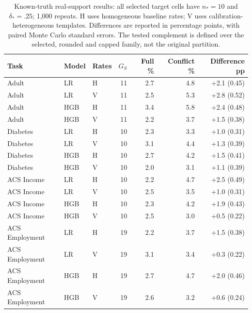 \begin{table}[t]
\centering\small
\caption{Known-truth real-support results: all selected target cells have $n_*=10$ and $\delta_*=.25$; 1,000 repeats. H uses homogeneous baseline rates; V uses calibration-heterogeneous templates. Differences are reported in percentage points, with paired Monte Carlo standard errors. The tested complement is defined over the selected, rounded and capped family, not the original partition.}\label{tab:semi}
\begin{tabular}{lllrrrr}
\toprule
Task & Model & Rates & $G_S$ & Full \% & Conflict \% & Difference pp \\
\midrule
Adult & LR & H & 11 & 2.7 & 4.8 & +2.1 (0.45) \\
Adult & LR & V & 11 & 2.5 & 5.3 & +2.8 (0.52) \\
Adult & HGB & H & 11 & 3.4 & 5.8 & +2.4 (0.48) \\
Adult & HGB & V & 11 & 2.2 & 3.7 & +1.5 (0.38) \\
Diabetes & LR & H & 10 & 2.3 & 3.3 & +1.0 (0.31) \\
Diabetes & LR & V & 10 & 3.1 & 4.4 & +1.3 (0.39) \\
Diabetes & HGB & H & 10 & 2.7 & 4.2 & +1.5 (0.41) \\
Diabetes & HGB & V & 10 & 2.0 & 3.1 & +1.1 (0.39) \\
ACS Income & LR & H & 10 & 2.2 & 4.7 & +2.5 (0.49) \\
ACS Income & LR & V & 10 & 2.5 & 3.5 & +1.0 (0.31) \\
ACS Income & HGB & H & 10 & 2.3 & 4.2 & +1.9 (0.43) \\
ACS Income & HGB & V & 10 & 2.5 & 3.0 & +0.5 (0.22) \\
ACS Employment & LR & H & 19 & 2.2 & 3.7 & +1.5 (0.38) \\
ACS Employment & LR & V & 19 & 3.1 & 3.4 & +0.3 (0.22) \\
ACS Employment & HGB & H & 19 & 2.7 & 4.7 & +2.0 (0.46) \\
ACS Employment & HGB & V & 19 & 2.6 & 3.2 & +0.6 (0.24) \\
\bottomrule
\end{tabular}
\end{table}
